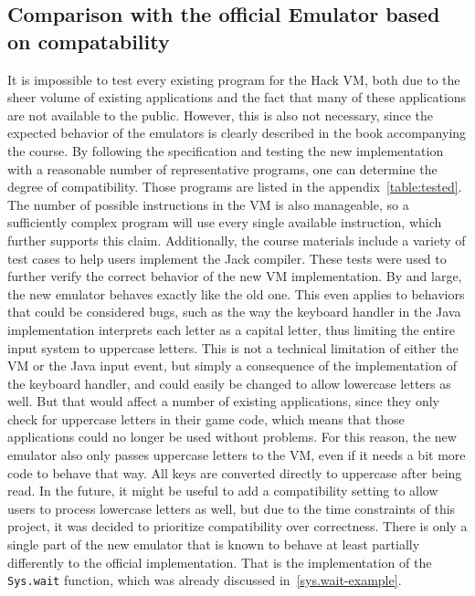 \subsection{Comparison with the official Emulator based on compatability} \label{compatibility}
It is impossible to test every existing program for the Hack VM, both due to the sheer volume of existing applications and the fact that many of these applications are not available to the public.
However, this is also not necessary, since the expected behavior of the emulators is clearly described in the book accompanying the course.
By following the specification and testing the new implementation with a reasonable number of representative programs, one can determine the degree of compatibility.
Those programs are listed in the appendix~\ref{table:tested}.
The number of possible instructions in the VM is also manageable, so a sufficiently complex program will use every single available instruction, which further supports this claim.
Additionally, the course materials include a variety of test cases to help users implement the Jack compiler.
These tests were used to further verify the correct behavior of the new VM implementation.
By and large, the new emulator behaves exactly like the old one.
This even applies to behaviors that could be considered bugs, such as the way the keyboard handler in the Java implementation interprets each letter as a capital letter, thus limiting the entire input system to uppercase letters.
This is not a technical limitation of either the VM or the Java input event, but simply a consequence of the implementation of the keyboard handler, and could easily be changed to allow lowercase letters as well.
But that would affect a number of existing applications, since they only check for uppercase letters in their game code, which means that those applications could no longer be used without problems.
For this reason, the new emulator also only passes uppercase letters to the VM, even if it needs a bit more code to behave that way.
All keys are converted directly to uppercase after being read.
In the future, it might be useful to add a compatibility setting to allow users to process lowercase letters as well, but due to the time constraints of this project, it was decided to prioritize compatibility over correctness.
There is only a single part of the new emulator that is known to behave at least partially differently to the official implementation.
That is the implementation of the \verb+Sys.wait+ function, which was already discussed in~\cref{sys.wait-example}.

